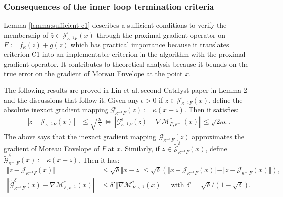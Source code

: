 \documentclass[12pt]{article}
\begin{document}
        \subsubsection{Consequences of the inner loop termination criteria}
            Lemma \ref{lemma:sufficient-c1} describes a sufficient conditions to verify the membership of $\bar z \in \mathcal J_{\kappa^{-1}F}^\epsilon (x)$ through the proximal gradient operator on $F:= f_\kappa(z) + g(z)$ which has practical importance because it translates criterion C1 into an implementable criterion in the algorithm with the proximal gradient operator. 
            It contributes to theoretical analysis because it bounds on the true error on the gradient of Moreau Envelope at the point $x$. 
            \par 
            The following results are proved in Lin et al. second Catalyst paper \cite{lin_catalyst_2018} in Lemma 2 and the discussions that follow it. 
            Given any $\epsilon > 0$ if $z \in \mathcal J_{\kappa^{-1}F}^\epsilon (x)$, define the absolute inexact gradient mapping $\mathcal G_{\kappa^{-1}F}^\epsilon (z) := \kappa(x - z)$.
            Then it satisfies: 
            \begin{align*}
                \left\Vert z - \mathcal J_{\kappa^{-1}F} (x)\right\Vert
                &\le \sqrt{\frac{2\epsilon}{\kappa}} 
                \iff 
                \left\Vert
                    \mathcal G_{\kappa^{-1}F}^\epsilon(z) 
                    - \nabla \mathcal M_{F, \kappa^{-1}}^*(x)
                \right\Vert 
                \le \sqrt{2\kappa\epsilon}. 
            \end{align*}
            The above says that the inexact gradient mapping $\mathcal G_{\kappa^{-1}F}^{\epsilon}(z)$ approximates the gradient of Moreau Envelope of $F$ at $x$. 
            Similarly, if $z \in \widetilde{\mathcal J}_{\kappa^{-1}F}^\delta(x)$, define $\widetilde{\mathcal G}_{\kappa^{-1}F}^\delta(x) := \kappa(x - z)$. 
            Then it has: 
            \begin{align*}
                \Vert z - \mathcal J_{\kappa^{-1}F}(x)\Vert 
                &\le \sqrt{\delta}\Vert x - z\Vert 
                \le \sqrt{\delta}(
                    \Vert x - \mathcal J_{\kappa^{-1}F} (x) \Vert 
                    - \Vert z - \mathcal J_{\kappa^{-1}F} (x) \Vert
                ), 
                \\
                \left\Vert 
                    \widetilde{\mathcal G}_{\kappa^{-1}F}^\delta(x) - 
                    \nabla \mathcal M^*_{F, \kappa^{-1}}(x) 
                \right\Vert
                &\le 
                \delta' \Vert \nabla \mathcal M^*_{F, \kappa^{-1}}(x) \Vert \quad 
                \text{with } \delta' = \sqrt{\delta}/\left(1 - \sqrt{\delta}\right). 
            \end{align*}
\end{document}
